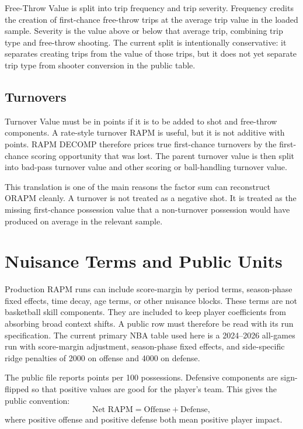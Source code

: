 \documentclass[11pt]{article}
\begin{document}
Free-Throw Value is split into trip frequency and trip severity.  Frequency
credits the creation of first-chance free-throw trips at the average trip value
in the loaded sample.  Severity is the value above or below that average trip,
combining trip type and free-throw shooting.  The current split is intentionally
conservative: it separates creating trips from the value of those trips, but it
does not yet separate trip type from shooter conversion in the public table.

\subsection{Turnovers}

Turnover Value must be in points if it is to be added to shot and free-throw
components.  A rate-style turnover RAPM is useful, but it is not additive with
points.  RAPM DECOMP therefore prices true first-chance turnovers by the
first-chance scoring opportunity that was lost.  The parent turnover value is
then split into bad-pass turnover value and other scoring or ball-handling
turnover value.

This translation is one of the main reasons the factor sum can reconstruct
ORAPM cleanly.  A turnover is not treated as a negative shot.  It is treated as
the missing first-chance possession value that a non-turnover possession would
have produced on average in the relevant sample.

\section{Nuisance Terms and Public Units}

Production RAPM runs can include score-margin by period terms, season-phase
fixed effects, time decay, age terms, or other nuisance blocks.  These terms are
not basketball skill components.  They are included to keep player coefficients
from absorbing broad context shifts.  A public row must therefore be read with
its run specification.  The current primary NBA table used here is a
2024--2026 all-games run with score-margin adjustment, season-phase fixed
effects, and side-specific ridge penalties of 2000 on offense and 4000 on
defense.

The public file reports points per 100 possessions.  Defensive components are
sign-flipped so that positive values are good for the player's team.  This
gives the public convention:
\[
\text{Net RAPM} = \text{Offense} + \text{Defense},
\]
where positive offense and positive defense both mean positive player impact.
\end{document}
